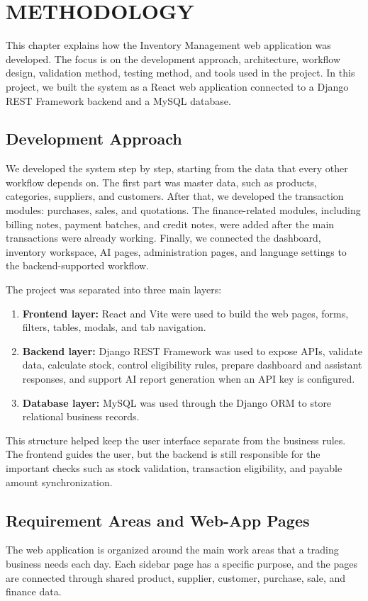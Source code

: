 \chapter{METHODOLOGY}

This chapter explains how the Inventory Management web application was developed. The focus is on the development approach, architecture, workflow design, validation method, testing method, and tools used in the project. In this project, we built the system as a React web application connected to a Django REST Framework backend and a MySQL database.

\section{Development Approach}
We developed the system step by step, starting from the data that every other workflow depends on. The first part was master data, such as products, categories, suppliers, and customers. After that, we developed the transaction modules: purchases, sales, and quotations. The finance-related modules, including billing notes, payment batches, and credit notes, were added after the main transactions were already working. Finally, we connected the dashboard, inventory workspace, AI pages, administration pages, and language settings to the backend-supported workflow.

The project was separated into three main layers:

\begin{enumerate}
	\item \textbf{Frontend layer:} React and Vite were used to build the web pages, forms, filters, tables, modals, and tab navigation.
	\item \textbf{Backend layer:} Django REST Framework was used to expose APIs, validate data, calculate stock, control eligibility rules, prepare dashboard and assistant responses, and support AI report generation when an API key is configured.
	\item \textbf{Database layer:} MySQL was used through the Django ORM to store relational business records.
\end{enumerate}

This structure helped keep the user interface separate from the business rules. The frontend guides the user, but the backend is still responsible for the important checks such as stock validation, transaction eligibility, and payable amount synchronization.

\section{Requirement Areas and Web-App Pages}
The web application is organized around the main work areas that a trading business needs each day. Each sidebar page has a specific purpose, and the pages are connected through shared product, supplier, customer, purchase, sale, and finance data.

